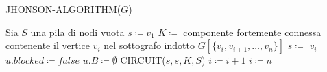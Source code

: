 \begin{algorithm}[H] 
    \caption{JHONSON-ALGORITHM($G$)}\label{alg:jhonson-algorithm}
    \begin{algorithmic}[1]
        \State Sia $S$ una pila di nodi vuota
        \State $s \coloneqq v_1$
            \State $K \coloneqq$ componente fortemente connessa contenente il vertice $v_i$
            nel sottografo indotto $G[\{v_i, v_{i+1}, \ldots, v_n\}]$
                \State $s \coloneqq $ $v_i$
                    \State $u.blocked \coloneqq false$
                    \State $u.B \coloneqq \emptyset$
                \EndFor
                \State CIRCUIT($s, s, K, S$)
                \State $i \coloneqq i + 1$
            \Else
                \State $i \coloneqq n$
            \EndIf
        \EndWhile
    \end{algorithmic}
\end{algorithm}